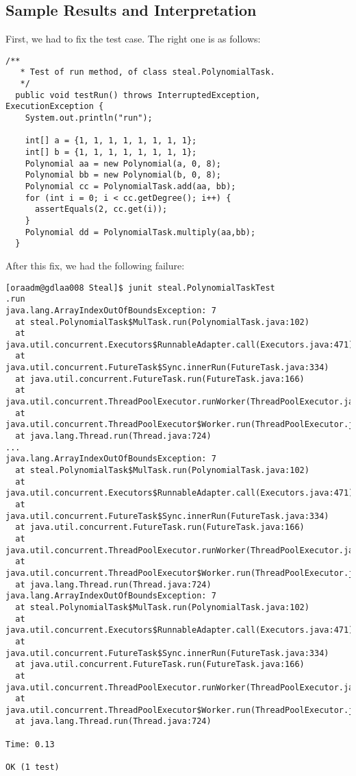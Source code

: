 \subsection{Sample Results and Interpretation}
\par
First, we had to fix the test case. The right one is as follows:
\par
\hfill
\begin{lstlisting}[style=numbers]
  /** 
   * Test of run method, of class steal.PolynomialTask.
   */
  public void testRun() throws InterruptedException, ExecutionException {
    System.out.println("run");
    
    int[] a = {1, 1, 1, 1, 1, 1, 1, 1}; 
    int[] b = {1, 1, 1, 1, 1, 1, 1, 1}; 
    Polynomial aa = new Polynomial(a, 0, 8); 
    Polynomial bb = new Polynomial(b, 0, 8); 
    Polynomial cc = PolynomialTask.add(aa, bb);
    for (int i = 0; i < cc.getDegree(); i++) {
      assertEquals(2, cc.get(i));
    }   
    Polynomial dd = PolynomialTask.multiply(aa,bb);
  }
\end{lstlisting}
\hfill
\par
After this fix, we had the following failure:
\par
\hfill
\begin{verbatim}
[oraadm@gdlaa008 Steal]$ junit steal.PolynomialTaskTest
.run
java.lang.ArrayIndexOutOfBoundsException: 7
  at steal.PolynomialTask$MulTask.run(PolynomialTask.java:102)
  at java.util.concurrent.Executors$RunnableAdapter.call(Executors.java:471)
  at java.util.concurrent.FutureTask$Sync.innerRun(FutureTask.java:334)
  at java.util.concurrent.FutureTask.run(FutureTask.java:166)
  at
java.util.concurrent.ThreadPoolExecutor.runWorker(ThreadPoolExecutor.java:1145)
  at
java.util.concurrent.ThreadPoolExecutor$Worker.run(ThreadPoolExecutor.java:615)
  at java.lang.Thread.run(Thread.java:724)
...
java.lang.ArrayIndexOutOfBoundsException: 7
  at steal.PolynomialTask$MulTask.run(PolynomialTask.java:102)
  at java.util.concurrent.Executors$RunnableAdapter.call(Executors.java:471)
  at java.util.concurrent.FutureTask$Sync.innerRun(FutureTask.java:334)
  at java.util.concurrent.FutureTask.run(FutureTask.java:166)
  at
java.util.concurrent.ThreadPoolExecutor.runWorker(ThreadPoolExecutor.java:1145)
  at
java.util.concurrent.ThreadPoolExecutor$Worker.run(ThreadPoolExecutor.java:615)
  at java.lang.Thread.run(Thread.java:724)
java.lang.ArrayIndexOutOfBoundsException: 7
  at steal.PolynomialTask$MulTask.run(PolynomialTask.java:102)
  at java.util.concurrent.Executors$RunnableAdapter.call(Executors.java:471)
  at java.util.concurrent.FutureTask$Sync.innerRun(FutureTask.java:334)
  at java.util.concurrent.FutureTask.run(FutureTask.java:166)
  at
java.util.concurrent.ThreadPoolExecutor.runWorker(ThreadPoolExecutor.java:1145)
  at
java.util.concurrent.ThreadPoolExecutor$Worker.run(ThreadPoolExecutor.java:615)
  at java.lang.Thread.run(Thread.java:724)

Time: 0.13

OK (1 test)
\end{verbatim}
